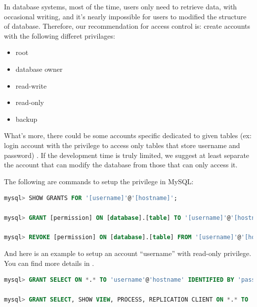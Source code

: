 \documentclass[conference]{IEEEtran}
\begin{document}
In database systems,
most of the time, users only need to retrieve data, with
occasional writing, and
it's nearly impossible for users to modified the structure of database.
Therefore,
our recommendation for access control is:
create accounts with the following differet privilages:
\begin{itemize}
\item
root
\item
database owner
\item
read-write
\item
read-only
\item
backup
\end{itemize}
What's more, there could be some
accounts specific dedicated to given tables (ex: login account with
the privilege to access only tables that store username and password)
\cite{MySQL_privilage}.
If the development time is truly limited, we suggest at least separate the account that
can modify the database from those that can only access it.

The following are commands to setup the privilege in MySQL:
\begin{lstlisting}[language=sql]
mysql> SHOW GRANTS FOR '[username]'@'[hostname]';

mysql> GRANT [permission] ON [database].[table] TO '[username]'@'[hostname]' IDENTIFIED BY '[password]';

mysql> REVOKE [permission] ON [database].[table] FROM '[username]'@'[hostname]';
\end{lstlisting}

And here is an example to setup an account ``username'' with read-only privilege.
You can find more details in \cite{MySQL_privilage_detail}.
\begin{lstlisting}[language=sql]
mysql> GRANT SELECT ON *.* TO 'username'@'hostname' IDENTIFIED BY 'password';

mysql> GRANT SELECT, SHOW VIEW, PROCESS, REPLICATION CLIENT ON *.* TO ...
\end{lstlisting}

\end{document}
